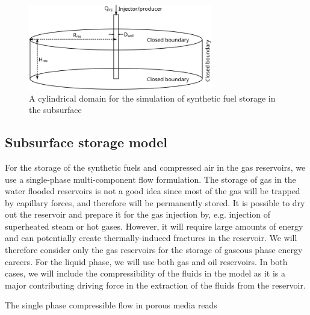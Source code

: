 \documentclass{ECOS_2021}
\begin{document}
\begin{figure}[H]
\includegraphics[width=8cm]{cylindrical_domain.svg}

\caption{\label{fig:A-cylindrical-domain}A cylindrical domain for the simulation
of synthetic fuel storage in the subsurface}
\end{figure}


\subsection{Subsurface storage model}

For the storage of the synthetic fuels and compressed air in the gas
reservoirs, we use a single-phase multi-component flow formulation.
The storage of gas in the water flooded reservoirs is not a good idea
since most of the gas will be trapped by capillary forces, and therefore
will be permanently stored. It is possible to dry out the reservoir
and prepare it for the gas injection by, e.g. injection of superheated
steam or hot gases. However, it will require large amounts of energy
and can potentially create thermally-induced fractures in the reservoir.
We will therefore consider only the gas reservoirs for the storage
of gaseous phase energy careers. For the liquid phase, we will use
both gas and oil reservoirs. In both cases, we will include the compressibility
of the fluids in the model as it is a major contributing driving force
in the extraction of the fluids from the reservoir.

The single phase compressible flow in porous media reads
\end{document}
